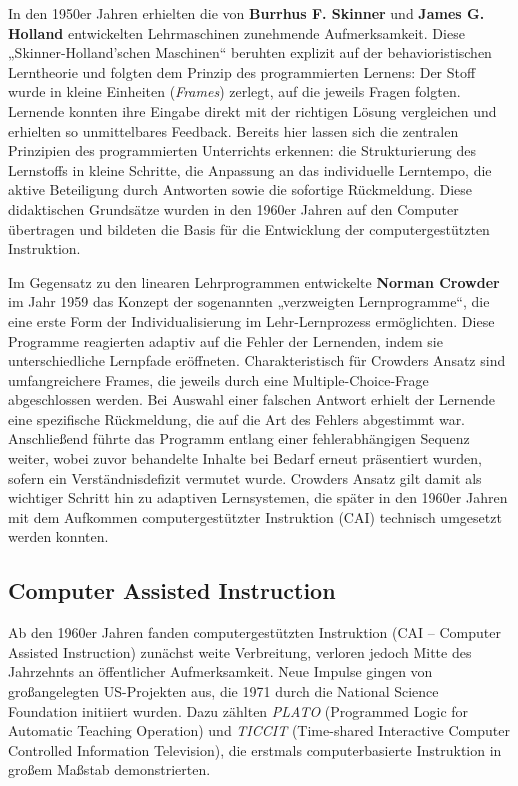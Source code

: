 In den 1950er Jahren erhielten die von \textbf{Burrhus F. Skinner} und \textbf{James G. Holland} entwickelten Lehrmaschinen zunehmende Aufmerksamkeit. Diese „Skinner-Holland’schen Maschinen“ beruhten explizit auf der behavioristischen Lerntheorie und folgten dem Prinzip des programmierten Lernens: Der Stoff wurde in kleine Einheiten (\textit{Frames}) zerlegt, auf die jeweils Fragen folgten. Lernende konnten ihre Eingabe direkt mit der richtigen Lösung vergleichen und erhielten so unmittelbares Feedback.\parencite[S.~970--977]{skinner_teaching_1958} Bereits hier lassen sich die zentralen Prinzipien des programmierten Unterrichts erkennen: die Strukturierung des Lernstoffs in kleine Schritte, die Anpassung an das individuelle Lerntempo, die aktive Beteiligung durch Antworten sowie die sofortige Rückmeldung.\parencite[S.~1971]{bruillard_teaching_2020} Diese didaktischen Grundsätze wurden in den 1960er Jahren auf den Computer übertragen und bildeten die Basis für die Entwicklung der computergestützten Instruktion.

Im Gegensatz zu den linearen Lehrprogrammen entwickelte \textbf{Norman Crowder} im Jahr 1959 das Konzept der sogenannten „verzweigten Lernprogramme“, die eine erste Form der Individualisierung im Lehr-Lernprozess ermöglichten. Diese Programme reagierten adaptiv auf die Fehler der Lernenden, indem sie unterschiedliche Lernpfade eröffneten. Charakteristisch für Crowders Ansatz sind umfangreichere Frames, die jeweils durch eine Multiple-Choice-Frage abgeschlossen werden. Bei Auswahl einer falschen Antwort erhielt der Lernende eine spezifische Rückmeldung, die auf die Art des Fehlers abgestimmt war. Anschließend führte das Programm entlang einer fehlerabhängigen Sequenz weiter, wobei zuvor behandelte Inhalte bei Bedarf erneut präsentiert wurden, sofern ein Verständnisdefizit vermutet wurde.\parencite[S.~252--254]{crowder_differences_1963}\parencite[S.~9]{schonfeld_computerbasiertes_2006} Crowders Ansatz gilt damit als wichtiger Schritt hin zu adaptiven Lernsystemen, die später in den 1960er Jahren mit dem Aufkommen computergestützter Instruktion (CAI) technisch umgesetzt werden konnten.

\subsection{Computer Assisted Instruction}


 Ab den 1960er Jahren fanden computergestützten Instruktion (CAI – Computer Assisted Instruction) zunächst weite Verbreitung, verloren jedoch Mitte des Jahrzehnts an öffentlicher Aufmerksamkeit. Neue Impulse gingen von großangelegten US-Projekten aus, die 1971 durch die National Science Foundation initiiert wurden. Dazu zählten \textit{PLATO} (Programmed Logic for Automatic Teaching Operation) und \textit{TICCIT} (Time-shared Interactive Computer Controlled Information Television), die erstmals computerbasierte Instruktion in großem Maßstab demonstrierten.\parencite[S.~7]{niegemann_kompendium_2008}\parencite[S.~69ff]{oshea_lernen_1986}

